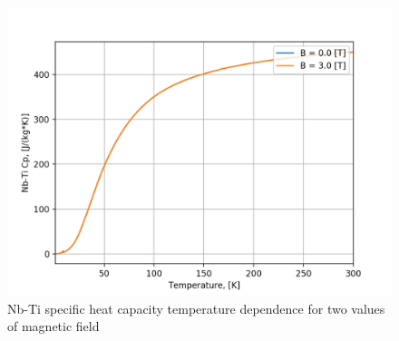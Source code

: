  \begin{figure}[h!]
    \centering
    \includegraphics[width=0.49\linewidth]{figures/material_properties/NbTi_Cp_B_Depenedence_plot.png}
    \caption{Nb-Ti specific heat capacity temperature dependence for two values of magnetic field}
    \label{fig:nbti_cp_plot}
\end{figure}
\newpage
